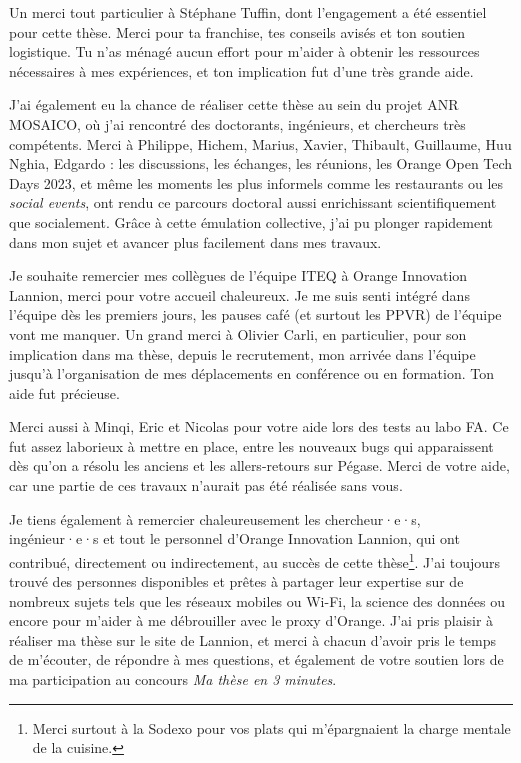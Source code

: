 Un merci tout particulier à Stéphane Tuffin, dont l'engagement a été essentiel pour cette thèse. Merci pour ta franchise, tes conseils avisés et ton soutien logistique. Tu n'as ménagé aucun effort pour m'aider à obtenir les ressources nécessaires à mes expériences, et ton implication fut d'une très grande aide.

J’ai également eu la chance de réaliser cette thèse au sein du projet ANR MOSAICO, où j’ai rencontré des doctorants, ingénieurs, et chercheurs très compétents. Merci à Philippe, Hichem, Marius, Xavier, Thibault, Guillaume, Huu Nghia, Edgardo : les discussions, les échanges, les réunions, les Orange Open Tech Days 2023, et même les moments les plus informels comme les restaurants ou les \textit{social events}, ont rendu ce parcours doctoral aussi enrichissant scientifiquement que socialement. Grâce à cette émulation collective, j’ai pu plonger rapidement dans mon sujet et avancer plus facilement dans mes travaux.

Je souhaite remercier mes collègues de l'équipe ITEQ à Orange Innovation Lannion, merci pour votre accueil chaleureux. Je me suis senti intégré dans l'équipe dès les premiers jours, les pauses café (et surtout les PPVR) de l'équipe vont me manquer. Un grand merci à Olivier Carli, en particulier, pour son implication dans ma thèse, depuis le recrutement, mon arrivée dans l'équipe jusqu'à l'organisation de mes déplacements en conférence ou en formation. Ton aide fut précieuse.

Merci aussi à Minqi, Eric et Nicolas pour votre aide lors des tests au labo FA. Ce fut assez laborieux à mettre en place, entre les nouveaux bugs qui apparaissent dès qu'on a résolu les anciens et les allers-retours sur Pégase. Merci de votre aide, car une partie de ces travaux n'aurait pas été réalisée sans vous.

Je tiens également à remercier chaleureusement les chercheur·e·s, ingénieur·e·s et tout le personnel d’Orange Innovation Lannion, qui ont contribué, directement ou indirectement, au succès de cette thèse\footnote{Merci surtout à la Sodexo pour vos plats qui m'épargnaient la charge mentale de la cuisine.}. J’ai toujours trouvé des personnes disponibles et prêtes à partager leur expertise sur de nombreux sujets tels que les réseaux mobiles ou Wi-Fi, la science des données ou encore pour m'aider à me débrouiller avec le proxy d'Orange. J'ai pris plaisir à réaliser ma thèse sur le site de Lannion, et merci à chacun d’avoir pris le temps de m’écouter, de répondre à mes questions, et également de votre soutien lors de ma participation au concours \textit{Ma thèse en 3 minutes}.   

